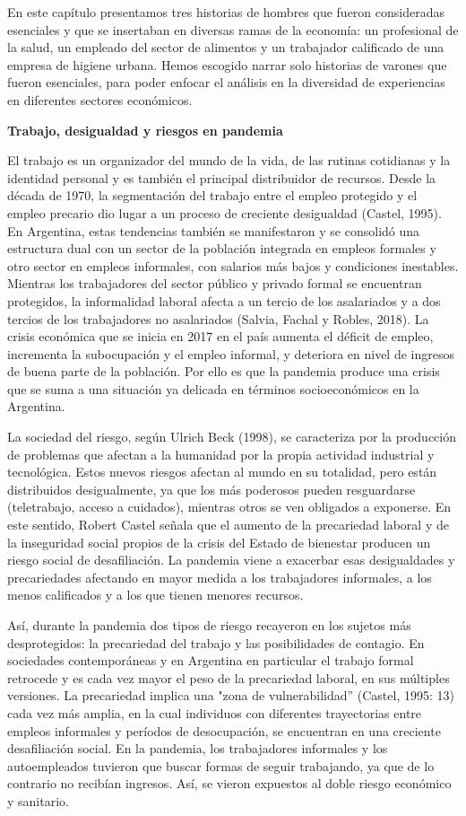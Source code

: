 En este capítulo presentamos tres historias de hombres que fueron consideradas esenciales y que se insertaban en diversas ramas de la economía: un profesional de la salud, un empleado del sector de alimentos y un trabajador calificado de una empresa de higiene urbana. Hemos escogido narrar solo historias de varones que fueron esenciales, para poder enfocar el análisis en la diversidad de experiencias en diferentes sectores económicos.

\textbf{Trabajo, desigualdad y riesgos en pandemia}

El trabajo es un organizador del mundo de la vida, de las rutinas cotidianas y la identidad personal y es también el principal distribuidor de recursos. Desde la década de 1970, la segmentación del trabajo entre el empleo protegido y el empleo precario dio lugar a un proceso de creciente desigualdad (Castel, 1995). En Argentina, estas tendencias también se manifestaron y se consolidó una estructura dual con un sector de la población integrada en empleos formales y otro sector en empleos informales, con salarios más bajos y condiciones inestables. Mientras los trabajadores del sector público y privado formal se encuentran protegidos, la informalidad laboral afecta a un tercio de los asalariados y a dos tercios de los trabajadores no asalariados (Salvia, Fachal y Robles, 2018). La crisis económica que se inicia en 2017 en el país aumenta el déficit de empleo, incrementa la subocupación y el empleo informal, y deteriora en nivel de ingresos de buena parte de la población. Por ello es que la pandemia produce una crisis que se suma a una situación ya delicada en términos socioeconómicos en la Argentina.

La sociedad del riesgo, según Ulrich Beck (1998), se caracteriza por la producción de problemas que afectan a la humanidad por la propia actividad industrial y tecnológica. Estos nuevos riesgos afectan al mundo en su totalidad, pero están distribuidos desigualmente, ya que los más poderosos pueden resguardarse (teletrabajo, acceso a cuidados), mientras otros se ven obligados a exponerse. En este sentido, Robert Castel señala que el aumento de la precariedad laboral y de la inseguridad social propios de la crisis del Estado de bienestar producen un riesgo social de desafiliación. La pandemia viene a exacerbar esas desigualdades y precariedades afectando en mayor medida a los trabajadores informales, a los menos calificados y a los que tienen menores recursos.

Así, durante la pandemia dos tipos de riesgo recayeron en los sujetos más desprotegidos: la precariedad del trabajo y las posibilidades de contagio. En sociedades contemporáneas y en Argentina en particular el trabajo formal retrocede y es cada vez mayor el peso de la precariedad laboral, en sus múltiples versiones. La precariedad implica una "zona de vulnerabilidad'' (Castel, 1995: 13) cada vez más amplia, en la cual individuos con diferentes trayectorias entre empleos informales y períodos de desocupación, se encuentran en una creciente desafiliación social. En la pandemia, los trabajadores informales y los autoempleados tuvieron que buscar formas de seguir trabajando, ya que de lo contrario no recibían ingresos. Así, se vieron expuestos al doble riesgo económico y sanitario.


